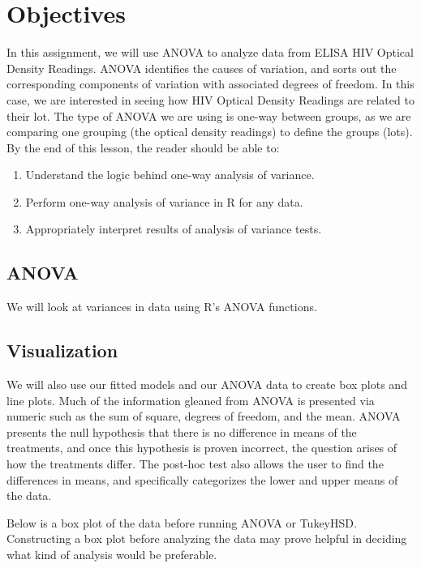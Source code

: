 \section{Objectives}

In this assignment, we will use ANOVA to analyze data from ELISA HIV Optical Density Readings.
ANOVA identifies the causes of variation, and sorts out the corresponding components of variation with associated degrees of freedom. 
In this case, we are interested in seeing how HIV Optical Density Readings are related to their lot. 
The type of ANOVA we are using is one-way between groups, as we are comparing one grouping (the optical density readings) to define the groups (lots). 
\singlespacing
By the end of this lesson, the reader should be able to:
\begin{enumerate}
        \item Understand the logic behind one-way analysis of variance.
        \item Perform one-way analysis of variance in R for any data. 
        \item Appropriately interpret results of analysis of variance tests.
\end{enumerate}

\subsection{ANOVA}

We will look at variances in data using R's ANOVA functions.

\subsection{Visualization}

We will also use our fitted models and our ANOVA data to create box plots and line plots. Much of the information gleaned from ANOVA is presented via numeric such as the sum of square, degrees of freedom, and the mean. ANOVA presents the null hypothesis that there is no difference in means of the treatments, and once this hypothesis is proven incorrect, the question arises of how the treatments differ. The post-hoc test also allows the user to find the differences in means, and specifically categorizes the lower and upper means of the data.

Below is a box plot of the data before running ANOVA or TukeyHSD. Constructing a box plot before analyzing the data may prove helpful in deciding what kind of analysis would be preferable.

